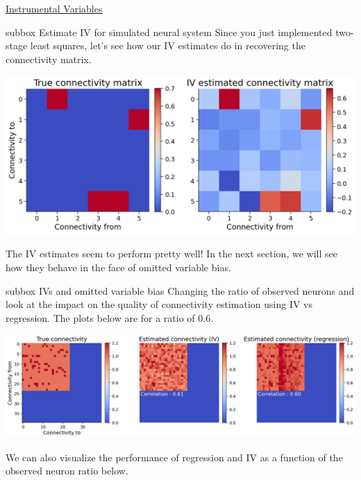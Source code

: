 \begin{textbox}{\href{https://compneuro.neuromatch.io/tutorials/W3D5_NetworkCausality/student/W3D5_Tutorial4.html}{Instrumental Variables }   }
\begin{subbox}{subbox}{ Estimate IV for simulated neural system
}
\scriptsize
Since you just implemented two-stage least squares, let's see how our IV estimates do in recovering the connectivity matrix.
\begin{center}
    
\includegraphics[scale=0.2]{Figures/NC/NC_Figure21.png}

\end{center}
The IV estimates seem to perform pretty well! In the next section, we will see how they behave in the face of omitted variable bias.

\end{subbox}

\begin{subbox}{subbox}{ IVs and omitted variable bias
}
\scriptsize
Changing the ratio of observed neurons and look at the impact on the quality of connectivity estimation using IV vs regression. The plots below are for a ratio of 0.6.

\begin{center}
    
\includegraphics[scale=0.16]{Figures/NC/NC_Figure22.png}

\end{center}
We can also visualize the performance of regression and IV as a function of the observed neuron ratio below.


\end{subbox}
\end{textbox}
